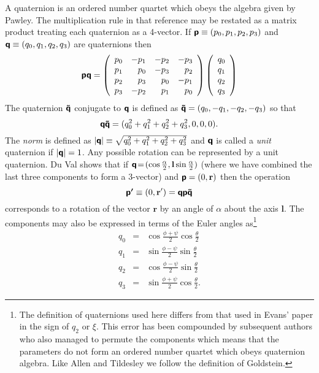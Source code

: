 \documentclass[a4paper,twoside]{report}
\newcommand{\bm}[1]{\mathbf{#1}}
\newcommand{\Quat}[1]{\mbox{\mathversion{bold}$\mathsf{#1}$}}
\begin{document}
A quaternion  is an ordered number  quartet  which obeys  the  algebra
given  by   Pawley\cite{pawley:81}.  The multiplication   rule in that
reference may be restated as a matrix product treating each quaternion
as a  4-vector.  If  $\Quat{p} \equiv (p_0,p_1,p_2,p_3)$ and  $\Quat{q}
\equiv  (q_0,q_1,q_2,q_3)$  are quaternions then
\begin{equation}
\Quat{pq} = 
\left(
\begin{array}{rrrr}
p_0 & -p_1 & -p_2 & -p_3 \\
p_1 &  p_0 & -p_3 &  p_2 \\
p_2 &  p_3 &  p_0 & -p_1 \\
p_3 & -p_2 &  p_1 &  p_0 
\end{array}
\right) \left(
\begin{array}{r}
q_0 \\ q_1 \\ q_2 \\ q_3
\end{array}
\right)
\end{equation}
The quaternion $ \Quat{\tilde{q}} $ conjugate to $\Quat{q}$ is defined
as $\Quat{\tilde{q}} = (q_0,-q_1,-q_2,-q_3)$ so that
\begin{equation}
\Quat{q\tilde{q}} = (q_0^2+q_1^2+q_2^2+q_3^2,0,0,0).
\label{eqn:qnorm}
\end{equation}
The \emph{norm} is defined as $ |\Quat{q}| \equiv
\sqrt{q_0^2+q_1^2+q_2^2+q_3^2} $ and $\Quat{q}$ is called a
\emph{unit} quaternion if $ |\Quat{q}| = 1 $.  Any possible rotation
can be represented by a unit quaternion. Du Val shows\cite{duval:64}
that if $ \Quat{q} \! = \! (\cos \frac{\alpha}{2}, \bm{l} \sin
\frac{\alpha}{2}) $ (where we have combined the last three components
to form a 3-vector) and $\Quat{p} = (0,\bm{r})$ then the operation
\begin{equation}
\Quat{p'} \equiv (0,\bm{r'}) = \Quat{q p \tilde{q}}
\end{equation}
corresponds to a rotation of the vector $\bm{r}$ by an angle of
$\alpha$ about the axis $\bm{l}$.  The components may also be
expressed in terms of the Euler angles as\footnote{The definition of
  quaternions used here differs from that used in Evans'
  paper\cite[equation 21]{evans:77} in the sign of $q_2$ or $\xi$.
  This error has been compounded by subsequent
  authors\cite{sonnenschein:85,smith:82,laakonsen:85} who also managed
  to permute the components which means that the parameters do not
  form an ordered number quartet which obeys quaternion algebra. Like
  Allen and Tildesley\cite[page 88]{allen:87} we follow the definition
  of Goldstein\cite[pages 143 and 155]{goldstein:80}.}
\begin{eqnarray}
q_0 & = & \cos \frac{\phi+\psi}{2} \cos \frac{\theta}{2} \nonumber \\
q_1 & = & \sin \frac{\phi-\psi}{2} \sin \frac{\theta}{2} \nonumber \\
q_2 & = & \cos \frac{\phi-\psi}{2} \sin \frac{\theta}{2} \nonumber \\
q_3 & = & \sin \frac{\phi+\psi}{2} \cos \frac{\theta}{2}.
\end{eqnarray}
\end{document}
